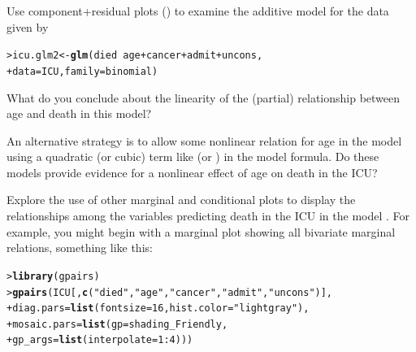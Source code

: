 \documentclass[10pt]{report}\usepackage[]{graphicx}\usepackage[]{color}
\makeatletter
\newcommand{\hlnum}[1]{\textcolor[rgb]{0.686,0.059,0.569}{#1}}%
\newcommand{\hlstr}[1]{\textcolor[rgb]{0.192,0.494,0.8}{#1}}%
\newcommand{\hlopt}[1]{\textcolor[rgb]{0,0,0}{#1}}%
\newcommand{\hlstd}[1]{\textcolor[rgb]{0.345,0.345,0.345}{#1}}%
\newcommand{\hlkwb}[1]{\textcolor[rgb]{0.69,0.353,0.396}{#1}}%
\newcommand{\hlkwc}[1]{\textcolor[rgb]{0.333,0.667,0.333}{#1}}%
\newcommand{\hlkwd}[1]{\textcolor[rgb]{0.737,0.353,0.396}{\textbf{#1}}}%
\newenvironment{kframe}{%
 \def\at@end@of@kframe{}%
 \ifinner\ifhmode%
  \def\at@end@of@kframe{\end{minipage}}%
  \begin{minipage}{\columnwidth}%
 \fi\fi%
 \def\FrameCommand##1{\hskip\@totalleftmargin \hskip-\fboxsep
 \colorbox{shadecolor}{##1}\hskip-\fboxsep
     \hskip-\linewidth \hskip-\@totalleftmargin \hskip\columnwidth}%
 \MakeFramed {\advance\hsize-\width
   \@totalleftmargin\z@ \linewidth\hsize
   \@setminipage}}%
 {\par\unskip\endMakeFramed%
 \at@end@of@kframe}
\newenvironment{knitrout}{}{} %
\renewenvironment{knitrout}{\small\renewcommand{\baselinestretch}{.85}}{} %
\makeatother
\begin{document}
\begin{Exercises}
\begin{enumerate*}
  \end{enumerate*}

\exercise Use component+residual plots () to examine the additive model for the  data
given by
\begin{knitrout}\footnotesize
{}\color{fgcolor}\begin{kframe}
\begin{alltt}
\hlstd{> }\hlstd{icu.glm2} \hlkwb{<-} \hlkwd{glm}\hlstd{(died} \hlopt{~} \hlstd{age} \hlopt{+} \hlstd{cancer}  \hlopt{+} \hlstd{admit} \hlopt{+} \hlstd{uncons,}
\hlstd{+ }                \hlkwc{data}\hlstd{=ICU,} \hlkwc{family}\hlstd{=binomial)}
\end{alltt}
\end{kframe}
\end{knitrout}
  \begin{enumerate*} 
    \item What do you conclude about the linearity of the 
    (partial) relationship between age and death in this model?
    \begin{ans}
    \end{ans}
    
    \item An alternative strategy is to allow some nonlinear relation for
    age in the model using a quadratic (or cubic) term like  
    (or ) in the
    model formula. Do these models provide evidence for a nonlinear effect of age
    on death in the ICU?
    \begin{ans}
    \end{ans}
    
  \end{enumerate*}
  

\exercise Explore the use of other marginal and conditional plots to display the relationships
among the variables predicting death in the ICU in the model .
For example, you might begin with a marginal  plot showing all bivariate
marginal relations, something like this:
\begin{knitrout}\footnotesize
{}\color{fgcolor}\begin{kframe}
\begin{alltt}
\hlstd{> }\hlkwd{library}\hlstd{(gpairs)}
\hlstd{> }\hlkwd{gpairs}\hlstd{(ICU[,}\hlkwd{c}\hlstd{(}\hlstr{"died"}\hlstd{,} \hlstr{"age"}\hlstd{,} \hlstr{"cancer"}\hlstd{,} \hlstr{"admit"}\hlstd{,} \hlstr{"uncons"}\hlstd{)],}
\hlstd{+ }  \hlkwc{diag.pars}\hlstd{=}\hlkwd{list}\hlstd{(}\hlkwc{fontsize}\hlstd{=}\hlnum{16}\hlstd{,} \hlkwc{hist.color}\hlstd{=}\hlstr{"lightgray"}\hlstd{),}
\hlstd{+ }  \hlkwc{mosaic.pars}\hlstd{=}\hlkwd{list}\hlstd{(}\hlkwc{gp}\hlstd{=shading_Friendly,}
\hlstd{+ }                   \hlkwc{gp_args}\hlstd{=}\hlkwd{list}\hlstd{(}\hlkwc{interpolate}\hlstd{=}\hlnum{1}\hlopt{:}\hlnum{4}\hlstd{)))}
\end{alltt}
\end{kframe}
\end{knitrout}
	\begin{ans}
	\end{ans}



\end{Exercises}
\end{document}
